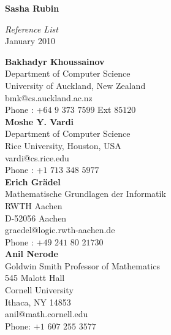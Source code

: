 \documentclass[a4paper]{article}
\begin{document}
\begin{center}
{\Huge \bf Sasha Rubin}
\end{center}

\begin{center}
{\huge \it Reference List} \\
\vspace{1em}
{\large January 2010}
\end {center}

{\bf Bakhadyr Khoussainov}\\
Department of Computer Science\\
University of Auckland, New Zealand\\
bmk@cs.auckland.ac.nz\\
Phone : +$64$ $9$ $373$ $7599$ Ext $85120$\\

{\bf Moshe Y. Vardi}\\
Department of Computer Science\\
Rice University, Houston, USA\\
vardi@cs.rice.edu\\
Phone : +$1$ $713$ $348$ $5977$\\

{\bf Erich Gr\"adel}\\
Mathematische Grundlagen der Informatik\\
RWTH Aachen\\
D-52056 Aachen\\
graedel@logic.rwth-aachen.de\\
Phone :	+$49$ $241$ $80$ $21730$\\

{\bf Anil Nerode}\\
Goldwin Smith Professor of Mathematics\\
545 Malott Hall\\
Cornell University\\
	 Ithaca, NY 14853\\
	 anil@math.cornell.edu\\
Phone: +$1$  $607$ $255$ $3577$\\
\end{document}
